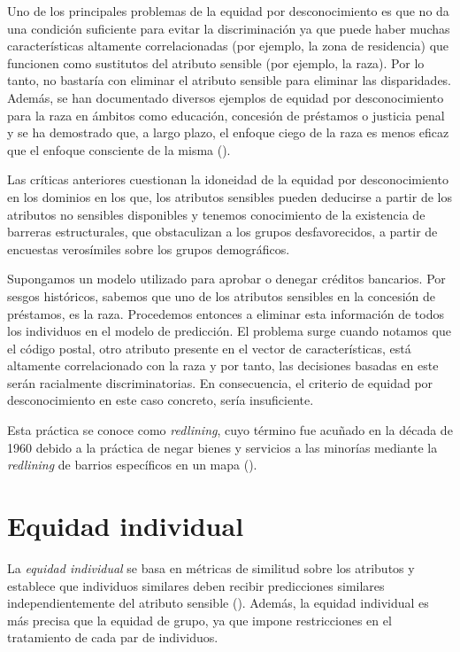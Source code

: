 \documentclass[oneside,openright,titlepage,numbers=noenddot,openany,headinclude,footinclude=true,
cleardoublepage=empty,abstractoff,BCOR=5mm,paper=a4,fontsize=12pt,main=spanish]{scrreprt}
\begin{document}
Uno de los principales problemas de la equidad por desconocimiento es que no da una condición suficiente para evitar la discriminación ya que puede haber muchas características altamente correlacionadas (por ejemplo, la zona de residencia) que funcionen como sustitutos del atributo sensible (por ejemplo, la raza). Por lo tanto, no bastaría con eliminar el atributo sensible para eliminar las disparidades. Además, se han documentado diversos ejemplos de equidad por desconocimiento para la raza en ámbitos como educación, concesión de préstamos o justicia
penal y se ha demostrado que, a largo plazo, el enfoque ciego de la raza es menos eficaz que el enfoque consciente de la misma (\cite{ceguera2008}).

Las críticas anteriores cuestionan la idoneidad de la
equidad por desconocimiento en los dominios en
los que, los atributos sensibles pueden deducirse a partir de los atributos no sensibles disponibles y tenemos conocimiento de la existencia de barreras estructurales, que obstaculizan a los grupos desfavorecidos, a partir de encuestas verosímiles sobre los grupos demográficos.

\begin{example} \label{ex:redlining}
Supongamos un modelo utilizado para aprobar o denegar créditos bancarios. Por sesgos históricos, sabemos que uno de los atributos sensibles en la concesión de préstamos, es la raza. Procedemos entonces a eliminar esta información de todos los individuos en el modelo de predicción. El problema surge cuando notamos que el código postal, otro atributo presente en el vector de características, está altamente correlacionado con la raza y por tanto, las decisiones basadas en este serán racialmente discriminatorias. En consecuencia, el criterio de equidad por desconocimiento en este caso concreto, sería insuficiente. 

Esta práctica se conoce como \textit{redlining}, cuyo término fue acuñado en la década de 1960 debido a la práctica de negar bienes y servicios a las minorías mediante la \textit{redlining} de barrios específicos en un mapa (\cite{redlining2012}).
\end{example}


\section{Equidad individual}

La \textit{equidad individual} se basa en métricas de similitud sobre los atributos y  establece que individuos similares deben recibir predicciones similares independientemente del atributo sensible (\cite{detect2012}). Además, la equidad individual es más precisa que la equidad de grupo, ya que impone restricciones en el tratamiento de cada par de individuos.\\ 
\end{document}
